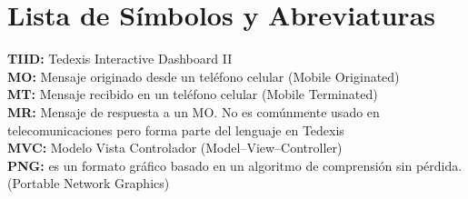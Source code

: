 \chapter*{Lista de Símbolos y Abreviaturas}%

\vspace{5 mm}
\noindent
\textbf{TIID:} Tedexis Interactive Dashboard II\\
\textbf{MO:} Mensaje originado desde un teléfono celular (Mobile Originated)\\
\textbf{MT:} Mensaje recibido en un teléfono celular (Mobile Terminated)\\
\textbf{MR:} Mensaje de respuesta a un MO. No es comúnmente usado en
telecomunicaciones pero forma parte del lenguaje en Tedexis\\
\textbf{MVC:} Modelo Vista Controlador (Model–View–Controller)\\ 
\textbf{PNG:} es un formato gráfico basado en un algoritmo de comprensión sin pérdida. (Portable Network Graphics)\\ 